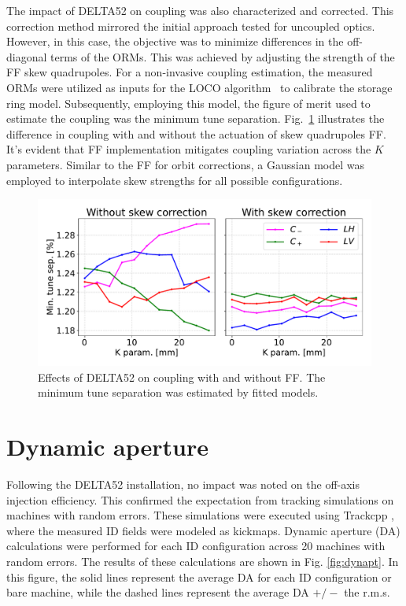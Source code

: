 \documentclass[a4paper,
               keeplastbox,   %
               ]{jacow}
\begin{document}
The impact of DELTA52 on coupling was also characterized and corrected. This correction method mirrored the initial approach tested for uncoupled optics. However, in this case, the objective was to minimize differences in the off-diagonal terms of the ORMs. This was achieved by adjusting the strength of the FF skew quadrupoles. For a non-invasive coupling estimation, the measured ORMs were utilized as inputs for the LOCO algorithm~\cite{Safranek} to calibrate the storage ring model. Subsequently, employing this model, the figure of merit used to estimate the coupling was the minimum tune separation. Fig.~\ref{fig:coupling} illustrates the difference in coupling with and without the actuation of skew quadrupoles FF. It's evident that FF implementation mitigates coupling variation across the $K$ parameters. Similar to the FF for orbit corrections, a Gaussian model was employed to interpolate skew strengths for all possible configurations.
 
\begin{figure}[]
    \centering
   \includegraphics[width=.88\columnwidth]{THPS18_f5.pdf}
   \caption{Effects of DELTA52 on coupling with and without FF. The minimum tune separation was estimated by fitted models.}
   \label{fig:coupling}
\end{figure}


\section{Dynamic aperture}

Following the DELTA52 installation, no impact was noted on the off-axis injection efficiency. This confirmed the expectation from tracking simulations on machines with random errors. These simulations were executed using Trackcpp \cite{Trackcpp}, where the measured ID fields were modeled as kickmaps. Dynamic aperture (DA) calculations were performed for each ID configuration across 20 machines with random errors. The results of these calculations are shown in Fig. \ref{fig:dynapt}. In this figure, the solid lines represent the average DA for each ID configuration or bare machine, while the dashed lines represent the average DA $+/-$ the r.m.s.
\end{document}
